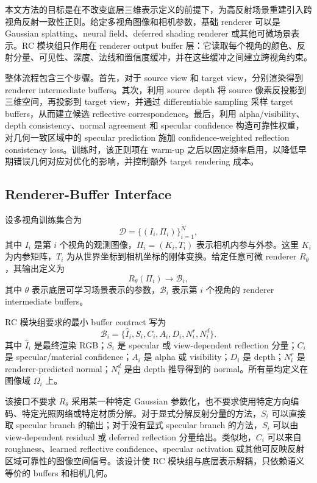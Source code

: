 \documentclass[UTF8,a4paper,11pt]{ctexart}
\begin{document}
本文方法的目标是在不改变底层三维表示定义的前提下，为高反射场景重建引入跨视角反射一致性正则。给定多视角图像和相机参数，基础 renderer 可以是 Gaussian splatting、neural field、deferred shading renderer 或其他可微场景表示。RC 模块组只作用在 renderer output buffer 层：它读取每个视角的颜色、反射分量、可见性、深度、法线和置信度缓冲，并在这些缓冲之间建立跨视角约束。

整体流程包含三个步骤。首先，对于 source view 和 target view，分别渲染得到 renderer intermediate buffers。其次，利用 source depth 将 source 像素反投影到三维空间，再投影到 target view，并通过 differentiable sampling 采样 target buffers，从而建立候选 reflective correspondence。最后，利用 alpha/visibility、depth consistency、normal agreement 和 specular confidence 构造可靠性权重，对几何一致区域中的 specular prediction 施加 confidence-weighted reflection consistency loss。训练时，该正则项在 warm-up 之后以固定频率启用，以降低早期错误几何对应对优化的影响，并控制额外 target rendering 成本。

\subsection{Renderer-Buffer Interface}

设多视角训练集合为
\begin{equation}
\mathcal{D}=\{(I_i,\Pi_i)\}_{i=1}^{N},
\end{equation}
其中 \(I_i\) 是第 \(i\) 个视角的观测图像，\(\Pi_i=(K_i,T_i)\) 表示相机内参与外参。这里 \(K_i\) 为内参矩阵，\(T_i\) 为从世界坐标到相机坐标的刚体变换。给定任意可微 renderer \(R_\theta\)，其输出定义为
\begin{equation}
R_\theta(\Pi_i)\rightarrow \mathcal{B}_i,
\end{equation}
其中 \(\theta\) 表示底层可学习场景表示的参数，\(\mathcal{B}_i\) 表示第 \(i\) 个视角的 renderer intermediate buffers。

RC 模块组要求的最小 buffer contract 写为
\begin{equation}
\mathcal{B}_i=
\{\hat{I}_i,S_i,C_i,A_i,D_i,N_i^r,N_i^d\}.
\end{equation}
其中 \(\hat{I}_i\) 是最终渲染 RGB；\(S_i\) 是 specular 或 view-dependent reflection 分量；\(C_i\) 是 specular/material confidence；\(A_i\) 是 alpha 或 visibility；\(D_i\) 是 depth；\(N_i^r\) 是 renderer-predicted normal；\(N_i^d\) 是由 depth 推导得到的 normal。所有量均定义在图像域 \(\Omega_i\) 上。

该接口不要求 \(R_\theta\) 采用某一种特定 Gaussian 参数化，也不要求使用特定方向编码、特定光照网络或特定材质分解。对于显式分解反射分量的方法，\(S_i\) 可以直接取 specular branch 的输出；对于没有显式 specular branch 的方法，\(S_i\) 可以由 view-dependent residual 或 deferred reflection 分量给出。类似地，\(C_i\) 可以来自 roughness、learned reflective confidence、specular activation 或其他可反映反射区域可靠性的图像空间信号。该设计使 RC 模块组与底层表示解耦，只依赖语义等价的 buffers 和相机几何。
\end{document}
